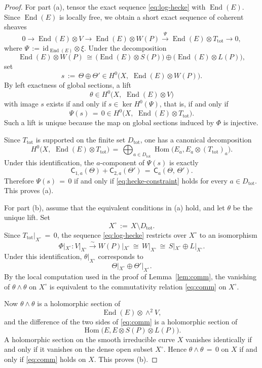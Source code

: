 \documentclass[a4paper,12pt]{amsart}
\numberwithin{equation}{section}
\theoremstyle{definition}
\newcommand{\End}{\operatorname{End}}
\newcommand{\Hom}{\operatorname{Hom}}
\newcommand{\id}{\mathrm{id}}
\begin{document}
\begin{proof}
For part \textup{(a)}, tensor the exact sequence \eqref{eq:log-hecke} with \(\End(E)\).  Since \(\End(E)\) is locally free, we obtain a short exact sequence of coherent sheaves
\[
0\longrightarrow \End(E)\otimes V
\longrightarrow
\End(E)\otimes W(P)
\xrightarrow{\ \Psi\ }
\End(E)\otimes T_{\mathrm{tot}}
\longrightarrow 0,
\]
where \(\Psi\,:=\,\id_{\End(E)}\otimes \xi\).  Under the decomposition
\[
\End(E)\otimes W(P)
\,\cong\,
\bigl(\End(E)\otimes S(P)\bigr)\oplus \bigl(\End(E)\otimes L(P)\bigr),
\]
set
\[
s\,:=\,\Theta\oplus \Theta'
\in H^0\bigl(X,\,\, \End(E)\otimes W(P)\bigr).
\]
By left exactness of global sections, a lift
\[
\theta\in H^0\bigl(X,\,\, \End(E)\otimes V\bigr)
\]
with image \(s\) exists if and only if \(s\in \ker H^0(\Psi)\), that is, if and only if
\[
\Psi(s)\,=\,0\in H^0\bigl(X,\,\, \End(E)\otimes T_{\mathrm{tot}}\bigr).
\]
Such a lift is unique because the map on global sections induced by \(\Phi\) is injective.

Since \(T_{\mathrm{tot}}\) is supported on the finite set \(D_{\mathrm{tot}}\), one has a canonical decomposition
\[
H^0\bigl(X,\,\, \End(E)\otimes T_{\mathrm{tot}}\bigr)
\,=\,
\bigoplus_{a\in D_{\mathrm{tot}}}
\Hom\bigl(E_a,E_a\otimes (T_{\mathrm{tot}})_a\bigr).
\]
Under this identification, the \(a\)-component of \(\Psi(s)\) is exactly
\[
\mathsf{C}_{1,a}(\Theta)+\mathsf{C}_{2,a}(\Theta')\,=\,\mathsf{C}_a(\Theta,\,\Theta').
\]
Therefore \(\Psi(s)\,=\,0\) if and only if \eqref{eq:hecke-constraint} holds for every \(a\in D_{\mathrm{tot}}\).  This proves \textup{(a)}.

For part \textup{(b)}, assume that the equivalent conditions in \textup{(a)} hold, and let \(\theta\) be the unique lift.  Set
\[
X^\circ\,:=\,X\setminus D_{\mathrm{tot}}.
\]
Since \(T_{\mathrm{tot}}|_{X^\circ}\,=\,0\), the sequence \eqref{eq:log-hecke} restricts over \(X^\circ\) to an isomorphism
\[
\Phi|_{X^\circ}:V|_{X^\circ}\xrightarrow{\sim} W(P)|_{X^\circ}\,\cong\, W|_{X^\circ}
\,\cong\, S|_{X^\circ}\oplus L|_{X^\circ}.
\]
Under this identification, \(\theta|_{X^\circ}\) corresponds to
\[
\Theta|_{X^\circ}\oplus \Theta'|_{X^\circ}.
\]
By the local computation used in the proof of Lemma~\ref{lem:comm}, the vanishing of \(\theta\wedge\theta\) on \(X^\circ\) is equivalent to the commutativity relation \eqref{eq:comm} on \(X^\circ\).

Now \(\theta\wedge\theta\) is a holomorphic section of
\[
\End(E)\otimes \wedge^2V,
\]
and the difference of the two sides of \eqref{eq:comm} is a holomorphic section of
\[
\Hom\bigl(E,E\otimes S(P)\otimes L(P)\bigr).
\]
A holomorphic section on the smooth irreducible curve \(X\) vanishes identically if and only if it vanishes on the dense open subset \(X^\circ\).  Hence \(\theta\wedge\theta\,=\,0\) on \(X\) if and only if \eqref{eq:comm} holds on \(X\).  This proves \textup{(b)}.
\end{proof}
\end{document}
